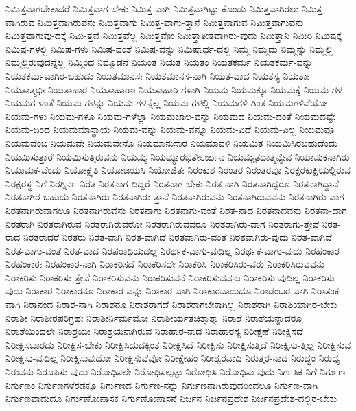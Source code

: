 {ನಿಮಿತ್ತವಾಗಬೇಕಾದರೆ
ನಿಮಿತ್ತವಾಗ-ಬೇಕು
ನಿಮಿತ್ತ-ವಾಗಿ
ನಿಮಿತ್ತವಾಗಿಟ್ಟು-ಕೊಂಡು
ನಿಮಿತ್ತವಾಗಿರಲು
ನಿಮಿತ್ತ-ವಾಗಿರುವ
ನಿಮಿತ್ತವಾಗಿರುವನು
ನಿಮಿತ್ತವಾಗು
ನಿಮಿತ್ತ-ವಾಗು-ತ್ತಾನೆ
ನಿಮಿತ್ತವಾಗುವ
ನಿಮಿತ್ತವಾಗುವನು
ನಿಮಿತ್ತವಾಗುವು-ದಕ್ಕೆ
ನಿಮಿ-ತ್ತವೆ
ನಿಮಿತ್ತವೆಲ್ಲ
ನಿಮಿತ್ತವೋ
ನಿಮಿತ್ತಾತೀತವಾಗಿರು-ವುದು
ನಿಮಿತ್ತಾನಿ
ನಿಮಿರಿ
ನಿಮಿಷಕ್ಕೆ
ನಿಮಿಷ-ಗಳಲ್ಲಿ
ನಿಮಿಷ-ಗಳು
ನಿಮಿಷ-ದಂತೆ
ನಿಮಿಷ-ವನ್ನು
ನಿಮಿಷಾರ್ಧ-ದಲ್ಲಿ
ನಿಮ್ಮ
ನಿಮ್ಮದು
ನಿಮ್ಮನ್ನು
ನಿಮ್ಮಲ್ಲಿ
ನಿಮ್ಮಲ್ಲಿರುವುದನ್ನೆಲ್ಲ
ನಿಮ್ಮಿಂದ
ನಿಮ್ಮೊಡನೆ
ನಿಯಂತ
ನಿಯತ
ನಿಯತಂ
ನಿಯತಕರ್ಮ
ನಿಯತಕರ್ಮ-ವನ್ನು
ನಿಯತಕರ್ಮವಾಗಿರ-ಬಹುದು
ನಿಯತಮಾನಸಃ
ನಿಯತಮಾನಸ-ನಾಗಿ
ನಿಯತ-ವಾದ
ನಿಯತಸ್ಯ
ನಿಯತಾಃ
ನಿಯತಾತ್ಮಭಿಃ
ನಿಯತಾಹಾರ
ನಿಯತಾಹಾರಾಃ
ನಿಯತಾಹಾರಿ-ಗಳಾಗಿ
ನಿಯಮ
ನಿಯಮಕ್ಕೂ
ನಿಯಮಕ್ಕೆ
ನಿಯಮ-ಗಳ
ನಿಯಮಗ-ಳಂತೆ
ನಿಯಮ-ಗಳನ್ನು
ನಿಯಮ-ಗಳನ್ನೆಲ್ಲ
ನಿಯಮ-ಗಳಲ್ಲಿ
ನಿಯಮಗಳಿ-ಗಿಂತ
ನಿಯಮಗಳಿವೆಯೋ
ನಿಯಮ-ಗಳು
ನಿಯಮ-ಗಳೂ
ನಿಯಮ-ಗಳೆಲ್ಲಾ
ನಿಯಮಜಾಲ-ವನ್ನು
ನಿಯಮದ
ನಿಯಮ-ದಂತೆ
ನಿಯಮದಷ್ಟೇ
ನಿಯಮ-ದಿಂದ
ನಿಯಮಮಾಸ್ಥಾಯ
ನಿಯಮ-ವನ್ನು
ನಿಯಮ-ವನ್ನೂ
ನಿಯಮ-ವಿದೆ
ನಿಯಮ-ವಿಲ್ಲ
ನಿಯಮವೂ
ನಿಯಮವೆಂಬ
ನಿಯಮವೇ
ನಿಯಮವೇನೊ
ನಿಯಮಾನುಸಾರ
ನಿಯಮಾವಳಿ
ನಿಯಮಿತ
ನಿಯಮಿಸಿರಬಹುದೆಂದು
ನಿಯಮಿಸುತ್ತಾರೆ
ನಿಯಮಿಸುತ್ತಿರುವನು
ನಿಯಮ್ಯ
ನಿಯಮ್ಯಾರಭತೇಽರ್ಜುನ
ನಿಯಮ್ಯೈತದಾತ್ಮನ್ಯೇವ
ನಿಯಾಮಕನಾಗಿರು
ನಿಯಾಮಕ-ವೆಂದು
ನಿಯೋಕ್ಷ್ಯತಿ
ನಿಯೋಜಯಸಿ
ನಿಯೋಜಿತಃ
ನಿರಂಕುಶ
ನಿರಂತರ
ನಿರಂತರವೂ
ನಿರಕ್ಷರಕುಕ್ಷಿಯಲ್ಲಿರುವ
ನಿರಕ್ಷರಸ್ಥ-ನಿಗೆ
ನಿರಗ್ನಿರ್ನ
ನಿರತ
ನಿರತನಾಗ-ದಿದ್ದರೆ
ನಿರತನಾಗ-ಬೇಕು
ನಿರತ-ನಾಗಿ
ನಿರತನಾಗಿದ್ದರೂ
ನಿರತನಾಗಿದ್ದಾನೆ
ನಿರತನಾಗಿರ-ಬಹುದು
ನಿರತನಾಗಿರು
ನಿರತನಾಗಿರು-ತ್ತಾನೆ
ನಿರತನಾಗಿರುವನು
ನಿರತನಾಗಿರುವವನು
ನಿರತನಾಗಿರು-ವಾಗ
ನಿರತನಾಗಿರುವಾಗಲೂ
ನಿರತನಾಗಿರುವೆನು
ನಿರತನಾಗು
ನಿರತನಾಗು-ವಂತೆ
ನಿರತ-ನಾದ
ನಿರತನಾದವನು
ನಿರತನಾ-ದಾಗ
ನಿರತರಾಗಿ
ನಿರತರಾಗಿರುವ
ನಿರತರಾಗಿರುವರೋ
ನಿರತರಾಗಿರುವವರೂ
ನಿರತರಾಗಿರು-ವಾಗ
ನಿರತರಾಗು-ತ್ತೇವೆ
ನಿರತ-ರಾದ
ನಿರತರಾದರೆ
ನಿರತರು
ನಿರತ-ವಾಗಿ
ನಿರತ-ವಾಗಿದೆ
ನಿರತವಾಗಿರು-ವಂತೆ
ನಿರತವಾಗಿರು-ವುದು
ನಿರತ-ವಾಗಿವೆ
ನಿರತ-ವಾಗು-ವಂತೆ
ನಿರತ-ವಾದ
ನಿರಪರಾಧಿಯದಲ್ಲ
ನಿರರ್ಥಕ-ವಾಗು-ವುದಿಲ್ಲ
ನಿರರ್ಥಕ-ವಾಗು-ವುದು
ನಿರಹಂಕಾರ
ನಿರಹಂಕಾರಃ
ನಿರಹಂಕಾರ-ನಾಗಿ
ನಿರಾಕರಿಸದೆ
ನಿರಾಕರಿಸದೇ
ನಿರಾಕರಿಸಿ
ನಿರಾಕರಿಸಿರು-ವರು
ನಿರಾಕರಿಸಿರುವವನು
ನಿರಾಕರಿಸು
ನಿರಾಕರಿಸು-ತ್ತೇವೆ
ನಿರಾಕರಿಸುವನು
ನಿರಾಕರಿಸುವನೆ
ನಿರಾಕರಿಸುವವನು
ನಿರಾಕರಿಸು-ವುದಿಲ್ಲ
ನಿರಾಕರಿಸು-ವುದು
ನಿರಾಕಾರ
ನಿರಾಕಾರನೂ
ನಿರಾಕಾರ-ವನ್ನು
ನಿರಾಕಾರ-ವಾಗಿ
ನಿರಾಕಾರವಾದುದೂ
ನಿರಾಡಂಬರ-ವಾಗಿ
ನಿರಾತಂಕ-ವಾಗಿ
ನಿರಾನಂದ
ನಿರಾಶ-ನಾಗಿ
ನಿರಾಶನೂ
ನಿರಾಶರಾಗದೆ
ನಿರಾಶರಾಗಬೇಕಾಗಿಲ್ಲ
ನಿರಾಶರಾಗಿ
ನಿರಾಶಿಯಾಗಿರ-ಬೇಕು
ನಿರಾಶೀ
ನಿರಾಶೀರಪರಿಗ್ರಹಃ
ನಿರಾಶೀರ್ನಿರ್ಮಮೋ
ನಿರಾಶೀರ್ಯತಚಿತ್ತಾತ್ಮಾ
ನಿರಾಶೆ
ನಿರಾಶೆಯನ್ನಾದರೂ
ನಿರಾಶೆಯಿಂದಲೇ
ನಿರಾಶ್ರಯಃ
ನಿರಾಶ್ರಯನಾಗಿರುವ
ನಿರಾಹಾರ-ನಾದ
ನಿರಾಹಾರಸ್ಯ
ನಿರೀಕ್ಷಣೆ
ನಿರೀಕ್ಷಿಸದೆ
ನಿರೀಕ್ಷಿಸಬಾರದು
ನಿರೀಕ್ಷಿಸ-ಬೇಕು
ನಿರೀಕ್ಷಿಸಿದುದಕ್ಕಿಂತ
ನಿರೀಕ್ಷಿಸಿದೆ
ನಿರೀಕ್ಷಿಸು
ನಿರೀಕ್ಷಿಸುತ್ತಿದೆ
ನಿರೀಕ್ಷಿಸು-ತ್ತಿಲ್ಲ
ನಿರೀಕ್ಷಿಸುವ
ನಿರೀಕ್ಷಿಸು-ವುದಿಲ್ಲ
ನಿರೀಕ್ಷಿಸುವುದೋ
ನಿರೀಕ್ಷಿಸುವೆವೋ
ನಿರೀಕ್ಷೇಹಂ
ನಿರೀಶ್ವರವಾದಿ
ನಿರುತ್ತರ-ನಾದ
ನಿರುದ್ಧಂ
ನಿರುಧ್ಯ
ನಿರುವನು
ನಿರೂಪಿಸು-ವುದು
ನಿರೋಧಿಸಲೇ
ನಿರೋಧಿಸಲ್ಪಟ್ಟು
ನಿರೋಧಿಸಿ
ನಿರೋಧಿಸು-ವುದು
ನಿರ್ಗತಿಕ-ನಿಗೆ
ನಿರ್ಗುಣ
ನಿರ್ಗುಣಂ
ನಿರ್ಗುಣಗಳೆರಡಕ್ಕೂ
ನಿರ್ಗುಣದ
ನಿರ್ಗುಣ-ನನ್ನು
ನಿರ್ಗುಣನಾಗಿರುವುದರಿಂದಲೂ
ನಿರ್ಗುಣ-ವಾಗಿ
ನಿರ್ಗುಣವಾದುದೂ
ನಿರ್ಗುಣೋಪಾಸಕ
ನಿರ್ಗುಣೋಪಾಸನೆ
ನಿರ್ಜನ
ನಿರ್ಜನಪ್ರದೇಶ
ನಿರ್ಜನಪ್ರದೇಶ-ದಲ್ಲಿರ-ಬೇಕು
}
